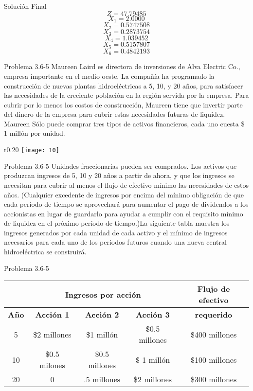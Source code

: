 \documentclass{beamer}
\begin{document}
\begin{frame}[fragile]{Soluci\'on Final}
\[Z = 47.79485 \]
\[X_{1} = 2.0000\]
\[X_{2} = 0.5747508\]
\[X_{3} = 0.2873754\]
\[X_{4} = 1.039452\]
\[X_{5} = 0.5157807\]
\[X_{6} = 0.4842193\]
\end{frame}

\begin{frame}[t,fragile]{Problema 3.6-5 }
Maureen Laird es directora de inversiones de Alva Electric Co., empresa importante en el medio oeste. La compañ\'ia ha programado la construcci\'on de nuevas plantas hidroel\'ectricas a 5, 10, y 20 años, para satisfacer las necesidades de la creciente poblaci\'on en la regi\'on servida por la empresa. Para cubrir por lo menos los costos de construcci\'on, Maureen tiene que invertir parte del dinero de  la empresa para cubrir estas necesidades futuras de liquidez. Maureen S\'olo puede comprar tres tipos de activos financieros, cada uno  cuesta \$ 1 mill\'on por unidad.
 \begin{wrapfigure}{r}{0.20\textwidth}
    \centering
    \texttt{[image: 10]}
\end{wrapfigure}
\end{frame}

\begin{frame}[t,fragile]{Problema 3.6-5 }
Unidades fraccionarias pueden ser comprados. Los activos que produzcan ingresos de 5, 10 y 20 años a partir de ahora, y que los ingresos se necesitan para cubrir al menos el flujo de efectivo m\'inimo las necesidades de estos años. (Cualquier excedente de ingresos por encima del m\'inimo obligaci\'on de que cada per\'iodo de tiempo se aprovechar\'a para aumentar el pago de dividendos a los accionistas en lugar de guardarlo para ayudar a cumplir con el requisito m\'inimo de liquidez en el pr\'oximo per\'iodo de tiempo.)La siguiente tabla muestra  los ingresos generados por cada unidad de cada activo y el  m\'inimo de ingresos necesarios para cada uno de los periodos futuros cuando una nueva central hidroel\'ectrica se construir\'a.
\end{frame}
\begin{frame}[t,fragile]{Problema 3.6-5 }
\begin{tabular}{|c|c|c|c|c|}
\hline 
 & \multicolumn{3}{c|}{\textbf{Ingresos por acci\'on}} & \textbf{{Flujo de efectivo} }\\ 
\hline 
\textbf{Año} & \textbf{Acci\'on 1} & \textbf{Acci\'on 2} & \textbf{Acci\'on 3} & \textbf{requerido} \\ 
\hline 
5 & \$2 millones & \$1 mill\'on & \$0.5 millones & \$400 millones \\ 
\hline 
10 & \$0.5 milones & \$0.5 millones & \$ 1 mill\'on & \$100 millones \\ 
\hline 
20 & 0 & \1.5 millones & \$2 millones & \$300 millones \\ 
\hline 
\end{tabular} 
\end{frame}
\end{document}
